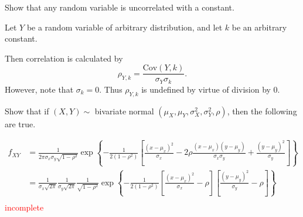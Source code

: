 \documentclass[12pt,letterpaper]{exam}
\begin{document}
\begin{questions}
\begin{solution}
\begin{parts}
		\end{parts}
	\end{solution}

	\setcounter{question}{40}
	\question 
	Show that any random variable is uncorrelated with a constant.
	
	\begin{solution}
		Let \(Y\) be a random variable of arbitrary distribution,
		and let \(k\) be an arbitrary constant.
		
		Then correlation is calculated by \[\rho_{Y,k} = \frac{\text{Cov}(Y,k)}{\sigma_Y\sigma_k}.\]
		However, note that \(\sigma_k =0\).
		Thus \(\rho_{Y,k}\) is undefined by virtue of division by 0.
	\end{solution}

	\setcounter{question}{44}
	\question 
	Show that if \((X,Y)\sim\) bivariate normal
	\((\mu_X, \mu_Y , \sigma_X^2 , \sigma_Y^2 , \rho)\), then the following are true.
	
	
	\begin{solution}
		\begin{align}
			f_{XY} 
			&= \frac{1}{2\pi\sigma_x\sigma_y\sqrt{1-\rho^2}} \exp \left\{- \frac{1}{2(1-\rho^2)} \left[\frac{(x-\mu_x)^2}{\sigma_x} 
				-2\rho\frac{(x-\mu_x)(y-\mu_y)}{\sigma_x\sigma_y} + \frac{(y-\mu_y)^2}{\sigma_y} \right]\right\} \\
			&= \frac{1}{\sigma_x\sqrt{2\pi}} \frac{1}{\sigma_y\sqrt{2\pi}} \frac{1}{\sqrt{1-\rho^2}}
			\exp \left\{- \frac{1}{2(1-\rho^2)} \left[\frac{(x-\mu_x)^2}{\sigma_x} - \rho \right] \left[
			\frac{(y-\mu_y)^2}{\sigma_y} - \rho \right]\right\} \\
		\end{align}
		\textcolor{red}{incomplete}
	\end{solution}


\end{questions}
\end{document}
